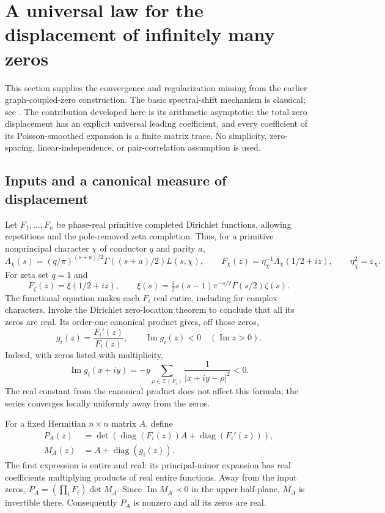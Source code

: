 \section{A universal law for the displacement of infinitely many zeros}
\label{sec:universal-transport}

This section supplies the convergence and regularization missing from the
earlier graph-coupled-zero construction. The basic spectral-shift mechanism
is classical; see \cite{bgn,reiffenstein}. The contribution developed here is its arithmetic asymptotic:
the total zero displacement has an explicit universal leading coefficient,
and every coefficient of its Poisson-smoothed expansion is a finite matrix
trace. No simplicity, zero-spacing, linear-independence, or pair-correlation
assumption is used.

\subsection{Inputs and a canonical measure of displacement}
\label{sec:setup}

Let $F_1,\ldots,F_n$ be phase-real primitive completed Dirichlet functions,
allowing repetitions and the pole-removed zeta completion. Thus, for a
primitive nonprincipal character $\chi$ of conductor $q$ and parity $a$,
\[
 \Lambda_\chi(s)=(q/\pi)^{(s+a)/2}\Gamma((s+a)/2)L(s,\chi),
 \qquad F_\chi(z)=\eta_\chi^{-1}\Lambda_\chi(1/2+iz),
 \qquad \eta_\chi^2=\varepsilon_\chi.
\]
For zeta set $q=1$ and
\[
 F_\zeta(z)=\xi(1/2+iz),\qquad
 \xi(s)=\tfrac12s(s-1)\pi^{-s/2}\Gamma(s/2)\zeta(s).
\]
The functional equation makes each $F_i$ real entire, including for complex
characters. Invoke the Dirichlet zero-location theorem to conclude that
all its zeros are real. Its order-one canonical product gives, off those
zeros,
\[
 g_i(z)=\frac{F_i'(z)}{F_i(z)},\qquad
 \operatorname{Im}g_i(z)<0\quad(\operatorname{Im}z>0).
\]
Indeed, with zeros listed with multiplicity,
\[
 \operatorname{Im}g_i(x+iy)
   =-y\sum_{\rho\in\mathcal Z(F_i)}\frac1{|x+iy-\rho|^2}<0.
\]
The real constant from the canonical product does not affect this formula;
the series converges locally uniformly away from the zeros.

For a fixed Hermitian $n\times n$ matrix $A$, define
\begin{align}
 P_A(z)&=\det\!\left(\operatorname{diag}(F_i(z))A+
                           \operatorname{diag}(F_i'(z))\right),
             \label{ut:defPA}\\
 M_A(z)&=A+\operatorname{diag}(g_i(z)). \label{ut:defMA}
\end{align}
The first expression is entire and real: its principal-minor expansion
has real coefficients multiplying products of real entire functions.
Away from the input zeros,
$P_A=(\prod_iF_i)\det M_A$. Since $\operatorname{Im}M_A\prec0$ in the
upper half-plane, $M_A$ is invertible there. Consequently $P_A$ is nonzero
and all its zeros are real.

